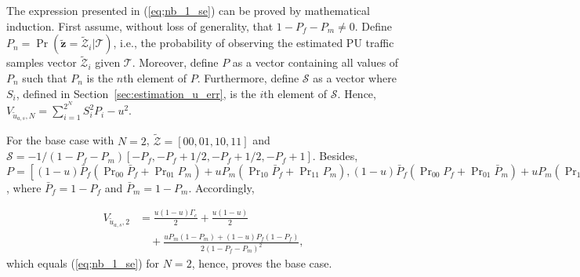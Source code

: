 \documentclass[11pt,draftclsnofoot,journal,onecolumn]{IEEEtran}
\begin{document}
\begin{IEEEproof}The expression presented in (\ref{eq;nb_1_se}) can be proved by mathematical induction. First assume, without loss of generality, that $1-P_f-P_m\neq0$. Define $P_n = \Pr(\tilde{\boldsymbol{z}} = \tilde{\mathcal{Z}}_i|\mathcal{T})$, i.e., the probability of observing the estimated PU traffic samples vector $\tilde{\mathcal{Z}}_i$ given $\mathcal{T}$. Moreover, define $P$ as a vector containing all values of $P_n$ such that $P_n$ is the $n$th element of $P$. Furthermore, define $\mathcal{S}$ as a vector where $S_{i}$, defined in Section~\ref{sec:estimation_u_err}, is the $i$th element of $\mathcal{S}$. Hence, $V_{\tilde{u}_{a,s},N} = \sum_{i=1}^{2^N} S_i^2 P_i - u^2$.

For the base case with $N=2$, $\tilde{\mathcal{Z}} = [00,01,10,11]$ and $\mathcal{S} = -1/(1-P_f-P_m)[-P_f,-P_f+1/2,-P_f+1/2,-P_f+1]$. Besides, $P = [(1-u)\bar{P}_f(\textstyle\Pr_{00}\bar{P}_f+\textstyle\Pr_{01}P_m) + uP_m(\textstyle\Pr_{10}\bar{P}_f+\textstyle\Pr_{11}P_m), (1-u)\bar{P}_f(\textstyle\Pr_{00}P_f+\textstyle\Pr_{01}\bar{P}_m) + uP_m(\textstyle\Pr_{10}P_f+\textstyle\Pr_{11}\bar{P}_m), (1-u)P_f(\textstyle\Pr_{00}\bar{P}_f+\textstyle\Pr_{01}P_m) + u\bar{P}_m(\textstyle\Pr_{10}\bar{P}_f+\textstyle\Pr_{11}P_m), (1-u)P_f(\textstyle\Pr_{00}P_f+\textstyle\Pr_{01}\bar{P}_m) + u\bar{P}_m(\textstyle\Pr_{10}P_f+\textstyle\Pr_{11}\bar{P}_m)]$, where $\bar{P}_f = 1-P_f$ and $\bar{P}_m = 1-P_m$. Accordingly, \addtocounter{equation}{1}
\begin{align}
V_{\tilde{u}_{a,s},2}&=\frac{u(1-u)\Gamma_c}{2} + \frac{u(1-u)}{2}\nonumber\\&\quad + \frac{uP_m(1-P_m)+(1-u)P_f(1-P_f)}{2(1-P_f-P_m)^2},
\end{align}
which equals (\ref{eq;nb_1_se}) for $N=2$, hence, proves the base case.


\end{IEEEproof}
\end{document}
